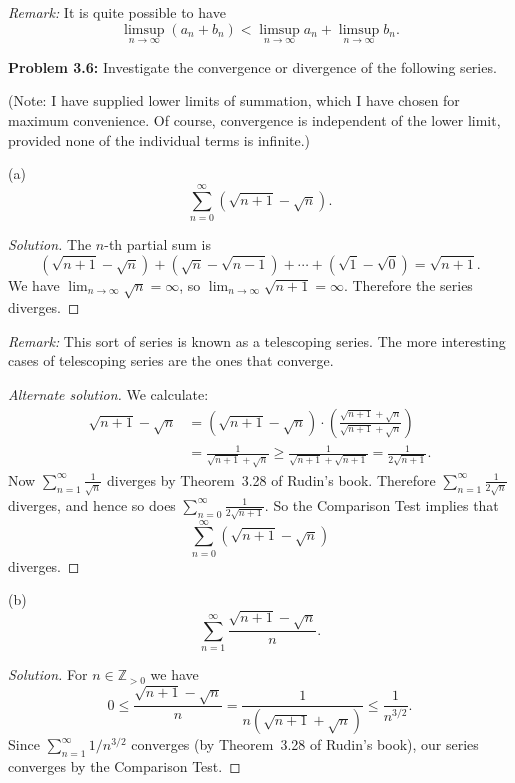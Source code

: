 \documentclass[10pt]{amsart}
\newcommand{\I}{\infty}
\newcommand{\limi}[1]{\lim_{{#1} \to \infty}}
\newcommand{\N}{{\mathbb{Z}}_{> 0}}
\begin{document}
\vspace{1ex}

\noindent
{\emph{Remark:}}
It is quite possible to have
\[
\limsup_{n \to \I} (a_n + b_n)
   < \limsup_{n \to \I} a_n + \limsup_{n \to \I} b_n.
\]

\vspace{2ex}

\noindent
{\textbf{Problem 3.6:}}
Investigate the convergence or divergence of the following series.

(Note: I have supplied lower limits of summation, which I have chosen
for maximum convenience.
Of course, convergence is independent of the lower limit, provided none
of the individual terms is infinite.)

(a)
\[
\sum_{n = 0}^{\I} \left( \sqrt{n + 1} - \sqrt{n} \right).
\]

\begin{proof}[Solution]
The $n$-th partial sum is
\[
\left( \sqrt{n + 1} - \sqrt{n} \right)
  + \left( \sqrt{n} - \sqrt{n-1} \right) + \cdots
  + \left( \sqrt{1} - \sqrt{0} \right) = \sqrt{n + 1}.
\]
We have $\limi{n} \sqrt{n} = \I$, so $\limi{n} \sqrt{n + 1} = \I$.
Therefore the series diverges.
\end{proof}


\noindent
{\emph{Remark:}}
This sort of series is known as a telescoping series.
The more interesting cases of telescoping series
are the ones that converge.

\begin{proof}[Alternate solution]
We calculate:
\begin{align*}
\sqrt{n + 1} - \sqrt{n}
  & = \left( \sqrt{n + 1} - \sqrt{n} \right) \cdot
         \left( \frac{\sqrt{n + 1}
               + \sqrt{n}}{\sqrt{n + 1} + \sqrt{n}} \right)
\\
  & = \frac{1}{\sqrt{n + 1} + \sqrt{n}}
    \geq \frac{1}{\sqrt{n + 1} + \sqrt{n + 1}}
     = \frac{1}{2 \sqrt{n + 1}}.
\end{align*}
Now $\sum_{n = 1}^{\I} \frac{1}{\sqrt{n}}$ diverges
by Theorem~3.28 of Rudin's book.
Therefore $\sum_{n = 1}^{\I} \frac{1}{2 \sqrt{n}}$ diverges, and hence
so does $\sum_{n = 0}^{\I} \frac{1}{2 \sqrt{n + 1}}$.
So the Comparison Test implies that
\[
\sum_{n = 0}^{\I} \left( \sqrt{n + 1} - \sqrt{n} \right)
\]
diverges.
\end{proof}


(b) 
\[
\sum_{n = 1}^{\I} \frac{\sqrt{n + 1} - \sqrt{n}}{n}.
\]

\begin{proof}[Solution]
For $n \in \N$ we have
\[
0 \leq \frac{\sqrt{n + 1} - \sqrt{n}}{n}
  = \frac{1}{n \left( \sqrt{n + 1} + \sqrt{n} \right)}
   \leq \frac{1}{n^{3/2}}.
\]
Since $\sum_{n = 1}^{\I} 1 / n^{3/2}$ converges
(by Theorem~3.28 of Rudin's book),
our series converges by the Comparison Test.
\end{proof}
\end{document}
